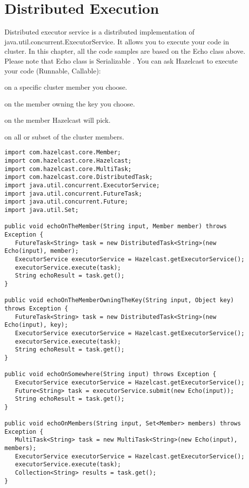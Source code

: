 \section{Distributed Execution}

Distributed executor service is a distributed implementation of java.util.concurrent.ExecutorService. It allows you to execute your code in cluster. In this chapter, all the code samples are based on the Echo class above. Please note that Echo class is Serializable . You can ask Hazelcast to execute your code (Runnable, Callable):

on a specific cluster member you choose.

on the member owning the key you choose.

on the member Hazelcast will pick.

on all or subset of the cluster members.

\begin{verbatim}
import com.hazelcast.core.Member;
import com.hazelcast.core.Hazelcast;
import com.hazelcast.core.MultiTask;
import com.hazelcast.core.DistributedTask;
import java.util.concurrent.ExecutorService;   
import java.util.concurrent.FutureTask;   
import java.util.concurrent.Future;   
import java.util.Set;

public void echoOnTheMember(String input, Member member) throws Exception {
   FutureTask<String> task = new DistributedTask<String>(new Echo(input), member);
   ExecutorService executorService = Hazelcast.getExecutorService();
   executorService.execute(task);
   String echoResult = task.get();
}

public void echoOnTheMemberOwningTheKey(String input, Object key) throws Exception {
   FutureTask<String> task = new DistributedTask<String>(new Echo(input), key);
   ExecutorService executorService = Hazelcast.getExecutorService();
   executorService.execute(task);
   String echoResult = task.get();
}

public void echoOnSomewhere(String input) throws Exception { 
   ExecutorService executorService = Hazelcast.getExecutorService();
   Future<String> task = executorService.submit(new Echo(input));
   String echoResult = task.get();
}

public void echoOnMembers(String input, Set<Member> members) throws Exception {
   MultiTask<String> task = new MultiTask<String>(new Echo(input), members);
   ExecutorService executorService = Hazelcast.getExecutorService();
   executorService.execute(task);
   Collection<String> results = task.get();
} 
\end{verbatim}

